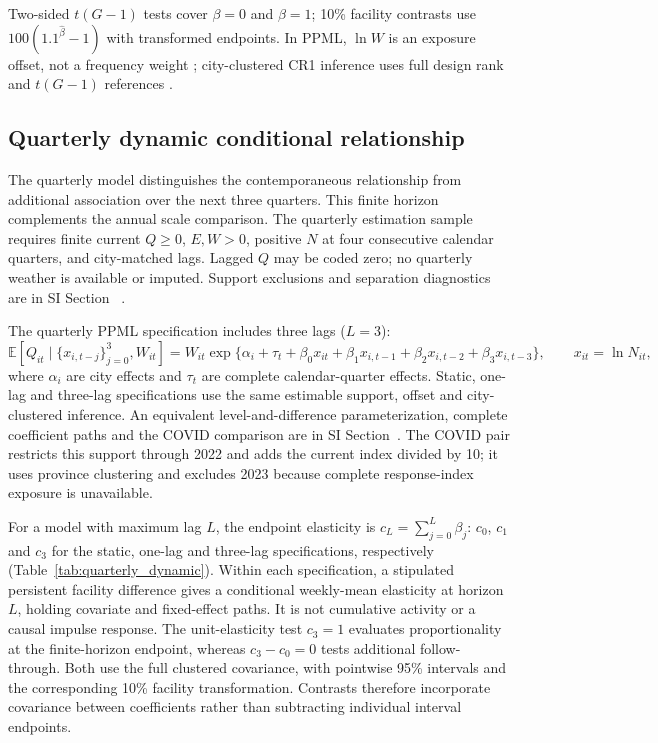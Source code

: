 Two-sided $t(G-1)$ tests cover $\beta=0$ and $\beta=1$; 10\% facility contrasts use $100(1.1^{\widehat\beta}-1)$ with transformed endpoints.  In PPML, $\ln W$ is an exposure offset, not a frequency weight \citep{silva2006}; city-clustered CR1 inference uses full design rank and $t(G-1)$ references \citep{cameron2015}.

\subsection{Quarterly dynamic conditional relationship}
The quarterly model distinguishes the contemporaneous relationship from additional association over the next three quarters. This finite horizon complements the annual scale comparison.  The quarterly estimation sample requires finite current $Q\geq0$, $E,W>0$, positive $N$ at four consecutive calendar quarters, and city-matched lags.  Lagged $Q$ may be coded zero; no quarterly weather is available or imputed.  Support exclusions and separation diagnostics are in SI Section~ \citep{correia2026separation}.

The quarterly PPML specification includes three lags ($L=3$):
\begin{equation}
 \mathbb{E}[Q_{it}\mid \{x_{i,t-j}\}_{j=0}^{3},W_{it}]
 =W_{it}\exp\{\alpha_i+\tau_t+\beta_0x_{it}+\beta_1x_{i,t-1}
 +\beta_2x_{i,t-2}+\beta_3x_{i,t-3}\},\qquad x_{it}=\ln N_{it},
 \label{eq:quarterly-d3}
\end{equation}
where $\alpha_i$ are city effects and $\tau_t$ are complete calendar-quarter effects.  Static, one-lag and three-lag specifications use the same estimable support, offset and city-clustered inference.  An equivalent level-and-difference parameterization, complete coefficient paths and the COVID comparison are in SI Section~.  The COVID pair restricts this support through 2022 and adds the current index divided by 10; it uses province clustering and excludes 2023 because complete response-index exposure is unavailable.

For a model with maximum lag $L$, the endpoint elasticity is $c_L=\sum_{j=0}^{L}\beta_j$: $c_0$, $c_1$ and $c_3$ for the static, one-lag and three-lag specifications, respectively (Table~\ref{tab:quarterly_dynamic}). Within each specification, a stipulated persistent facility difference gives a conditional weekly-mean elasticity at horizon $L$, holding covariate and fixed-effect paths.  It is not cumulative activity or a causal impulse response.  The unit-elasticity test $c_3=1$ evaluates proportionality at the finite-horizon endpoint, whereas $c_3-c_0=0$ tests additional follow-through. Both use the full clustered covariance, with pointwise 95\% intervals and the corresponding 10\% facility transformation. Contrasts therefore incorporate covariance between coefficients rather than subtracting individual interval endpoints.

